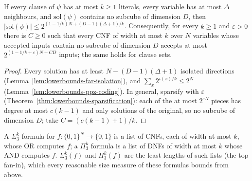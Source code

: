 \begin{theorem}
  \label{thm:lowerbounds-subcube-free-kcnf}
  \leanok
  If every clause of $\psi$ has at most $k\ge1$ literals, every variable has at
  most $\Delta$ neighbours, and $\mathrm{sol}(\psi)$ contains no subcube of
  dimension $D$, then
  $|\mathrm{sol}(\psi)|\le 2^{(1-1/k)N+(D-1)(\Delta+1)/k}$. Consequently, for every
  $k\ge1$ and $\varepsilon>0$ there is $C\ge0$ such that every CNF of width at most
  $k$ over $N$ variables whose accepted inputs contain no subcube of dimension $D$
  accepts at most $2^{(1-1/k+\varepsilon)N+CD}$ inputs; the same holds for clause
  sets.
\end{theorem}
\begin{proof}
  \leanok
  Every solution has at least $N-(D-1)(\Delta+1)$ isolated directions
  (Lemma~\ref{lem:lowerbounds-far-isolation}), and
  $\sum_x2^{\iota(x)/k}\le2^N$ (Lemma~\ref{lem:lowerbounds-ppz-coding}). In
  general, sparsify with $\varepsilon$
  (Theorem~\ref{thm:lowerbounds-sparsification}): each of the at most
  $2^{\varepsilon N}$ pieces has degree at most $c(k-1)$ and only solutions of the
  original, so no subcube of dimension $D$; take $C=(c(k-1)+1)/k$.
\end{proof}

\begin{definition}
  \label{def:lowerbounds-depth-three}
  \leanok
  A $\Sigma_3^k$ formula for $f\colon\{0,1\}^N\to\{0,1\}$ is a list of CNFs, each
  of width at most $k$, whose OR computes $f$; a $\Pi_3^k$ formula is a list of
  DNFs of width at most $k$ whose AND computes $f$. $\Sigma_3^k(f)$ and
  $\Pi_3^k(f)$ are the least lengths of such lists (the top fan-in), which every
  reasonable size measure of these formulas bounds from above.
\end{definition}

